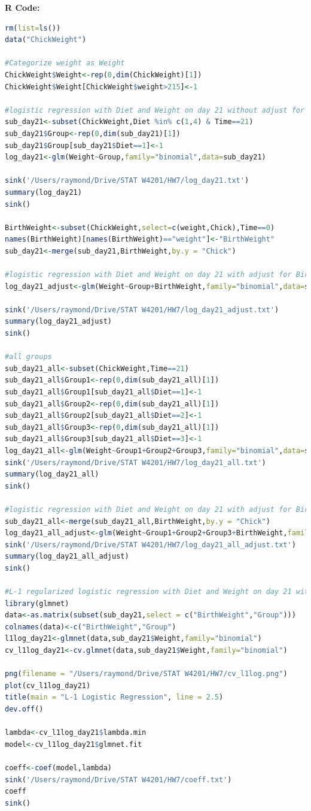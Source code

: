 \documentclass[10pt,letterpaper]{article}
\begin{document}
\newpage
\textbf{R Code:}
\begin{lstlisting}[language=R]
rm(list=ls())
data("ChickWeight")

#Categorize weight as Weight
ChickWeight$Weight<-rep(0,dim(ChickWeight)[1])
ChickWeight$Weight[ChickWeight$weight>215]<-1

#logistic regression with Diet and Weight on day 21 without adjust for Birth Weight
sub_day21<-subset(ChickWeight,Diet %in% c(1,4) & Time==21)
sub_day21$Group<-rep(0,dim(sub_day21)[1])
sub_day21$Group[sub_day21$Diet==1]<-1
log_day21<-glm(Weight~Group,family="binomial",data=sub_day21)

sink('/Users/raymond/Drive/STAT W4201/HW7/log_day21.txt')
summary(log_day21)
sink()

BirthWeight<-subset(ChickWeight,select=c(weight,Chick),Time==0)
names(BirthWeight)[names(BirthWeight)=="weight"]<-"BirthWeight"
sub_day21<-merge(sub_day21,BirthWeight,by.y = "Chick")

#logistic regression with Diet and Weight on day 21 with adjust for Birth Weight
log_day21_adjust<-glm(Weight~Group+BirthWeight,family="binomial",data=sub_day21)

sink('/Users/raymond/Drive/STAT W4201/HW7/log_day21_adjust.txt')
summary(log_day21_adjust)
sink()

#all groups 
sub_day21_all<-subset(ChickWeight,Time==21)
sub_day21_all$Group1<-rep(0,dim(sub_day21_all)[1])
sub_day21_all$Group1[sub_day21_all$Diet==1]<-1
sub_day21_all$Group2<-rep(0,dim(sub_day21_all)[1])
sub_day21_all$Group2[sub_day21_all$Diet==2]<-1
sub_day21_all$Group3<-rep(0,dim(sub_day21_all)[1])
sub_day21_all$Group3[sub_day21_all$Diet==3]<-1
log_day21_all<-glm(Weight~Group1+Group2+Group3,family="binomial",data=sub_day21_all)
sink('/Users/raymond/Drive/STAT W4201/HW7/log_day21_all.txt')
summary(log_day21_all)
sink()

#logistic regression with Diet and Weight on day 21 with adjust for Birth Weight
sub_day21_all<-merge(sub_day21_all,BirthWeight,by.y = "Chick")
log_day21_all_adjust<-glm(Weight~Group1+Group2+Group3+BirthWeight,family="binomial",data=sub_day21_all)
sink('/Users/raymond/Drive/STAT W4201/HW7/log_day21_all_adjust.txt')
summary(log_day21_all_adjust)
sink()

#L-1 regularized logistic regression with Diet and Weight on day 21 without adjust for Birth Weight
library(glmnet)
data<-as.matrix(subset(sub_day21,select = c("BirthWeight","Group")))
colnames(data)<-c("BirthWeight","Group")
l1log_day21<-glmnet(data,sub_day21$Weight,family="binomial")
cv_l1log_day21<-cv.glmnet(data,sub_day21$Weight,family="binomial")

png(filename = "/Users/raymond/Drive/STAT W4201/HW7/cv_l1log.png")
plot(cv_l1log_day21)
title(main = "L-1 Logistic Regression", line = 2.5)
dev.off()

lambda<-cv_l1log_day21$lambda.min
model<-cv_l1log_day21$glmnet.fit

coeff<-coef(model,lambda)
sink('/Users/raymond/Drive/STAT W4201/HW7/coeff.txt')
coeff
sink()
\end{lstlisting}
\end{document}

